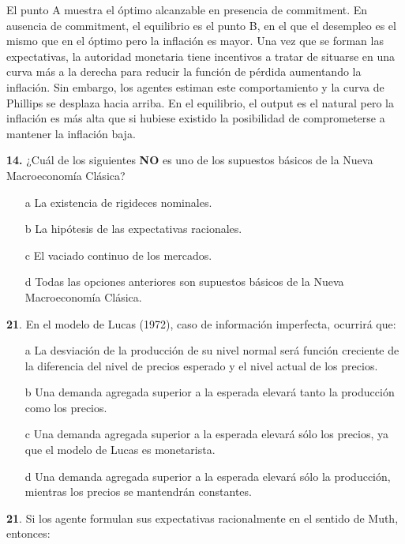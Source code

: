 \documentclass{nuevotema}
\begin{document}
El punto A muestra el óptimo alcanzable en presencia de commitment. En ausencia de commitment, el equilibrio es el punto B, en el que el desempleo es el mismo que en el óptimo pero la inflación es mayor. Una vez que se forman las expectativas, la autoridad monetaria tiene incentivos a tratar de situarse en una curva más a la derecha para reducir la función de pérdida aumentando la inflación. Sin embargo, los agentes estiman este comportamiento y la curva de Phillips se desplaza hacia arriba. En el equilibrio, el output es el natural pero la inflación es más alta que si hubiese existido la posibilidad de comprometerse a mantener la inflación baja.

\preguntas


\textbf{14.} ¿Cuál de los siguientes \textbf{NO} es uno de los supuestos básicos de la Nueva Macroeconomía Clásica? 

\begin{itemize}
	\item[a] La existencia de rigideces nominales.
	\item[b] La hipótesis de las expectativas racionales.
	\item[c] El vaciado continuo de los mercados.
	\item[d] Todas las opciones anteriores son supuestos básicos de la Nueva Macroeconomía Clásica.
\end{itemize}



\textbf{21}. En el modelo de Lucas (1972), caso de información imperfecta, ocurrirá que:

\begin{enumerate}
	\item[a] La desviación de la producción de su nivel normal será función creciente de la diferencia del nivel de precios esperado y el nivel actual de los precios.
	\item[b] Una demanda agregada superior a la esperada elevará tanto la producción como los precios.
	\item[c] Una demanda agregada superior a la esperada elevará sólo los precios, ya que el modelo de Lucas es monetarista.
	\item[d] Una demanda agregada superior a la esperada elevará sólo la producción, mientras los precios se mantendrán constantes.
\end{enumerate}

\textbf{21}. Si los agente formulan sus expectativas racionalmente en el sentido de Muth, entonces:
\end{document}
